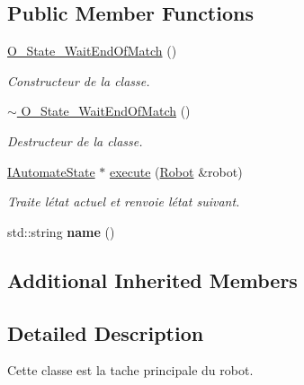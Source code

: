 \subsection*{Public Member Functions}
\begin{DoxyCompactItemize}
\item 
\mbox{\label{classO__State__WaitEndOfMatch_a3ceee2fc7c0abf9cb714e92d2fa6768f}} 
\hyperlink{classO__State__WaitEndOfMatch_a3ceee2fc7c0abf9cb714e92d2fa6768f}{O\+\_\+\+State\+\_\+\+Wait\+End\+Of\+Match} ()
\begin{DoxyCompactList}\small\item\em Constructeur de la classe. \end{DoxyCompactList}\item 
\mbox{\label{classO__State__WaitEndOfMatch_a4e62172b4c4e3fddccca87ec984420be}} 
\hyperlink{classO__State__WaitEndOfMatch_a4e62172b4c4e3fddccca87ec984420be}{$\sim$ O\+\_\+\+State\+\_\+\+Wait\+End\+Of\+Match} ()
\begin{DoxyCompactList}\small\item\em Destructeur de la classe. \end{DoxyCompactList}\item 
\hyperlink{classIAutomateState}{I\+Automate\+State} $\ast$ \hyperlink{classO__State__WaitEndOfMatch_aa73613440b37c8dd42181e2e0265ae86}{execute} (\hyperlink{classRobot}{Robot} \&robot)
\begin{DoxyCompactList}\small\item\em Traite l\textquotesingle{}état actuel et renvoie l\textquotesingle{}état suivant. \end{DoxyCompactList}\item 
\mbox{\label{classO__State__WaitEndOfMatch_a45b9162c829d3bb4e4c6bc471da1be40}} 
std\+::string {\bfseries name} ()
\end{DoxyCompactItemize}
\subsection*{Additional Inherited Members}


\subsection{Detailed Description}
Cette classe est la tache principale du robot. 

